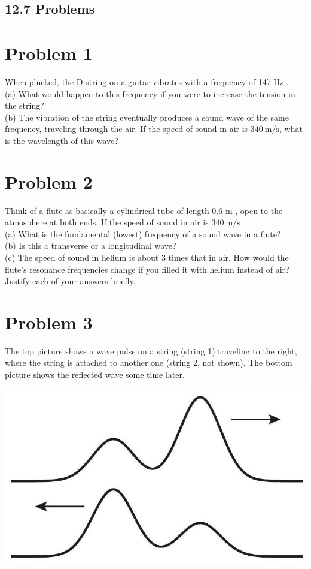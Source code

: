\documentclass[10pt]{article}
\begin{document}
\subsection*{12.7 Problems}
\section*{Problem 1}
When plucked, the D string on a guitar vibrates with a frequency of 147 Hz .\\
(a) What would happen to this frequency if you were to increase the tension in the string?\\
(b) The vibration of the string eventually produces a sound wave of the same frequency, traveling through the air. If the speed of sound in air is $340 \mathrm{~m} / \mathrm{s}$, what is the wavelength of this wave?

\section*{Problem 2}
Think of a flute as basically a cylindrical tube of length 0.6 m , open to the atmosphere at both ends. If the speed of sound in air is $340 \mathrm{~m} / \mathrm{s}$\\
(a) What is the fundamental (lowest) frequency of a sound wave in a flute?\\
(b) Is this a transverse or a longitudinal wave?\\
(c) The speed of sound in helium is about 3 times that in air. How would the flute's resonance frequencies change if you filled it with helium instead of air?\\
Justify each of your answers briefly.

\section*{Problem 3}
The top picture shows a wave pulse on a string (string 1) traveling to the right, where the string is attached to another one (string 2, not shown). The bottom picture shows the reflected wave some time later.

\begin{center}
\includegraphics[max width=\textwidth]{2024_09_14_9969b06773f10b6936e8g-320}
\end{center}
\end{document}
